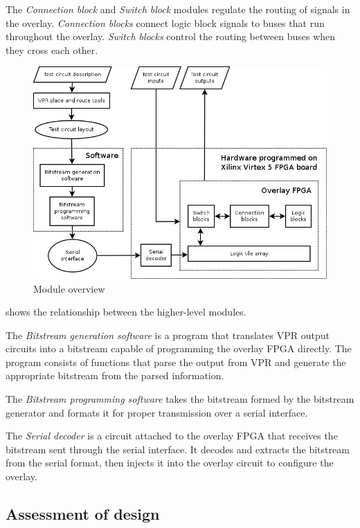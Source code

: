 The \emph{Connection block} and \emph{Switch block} modules regulate the routing of signals in the overlay.
\emph{Connection blocks} connect logic block signals to buses that run throughout the 
overlay.
\emph{Switch blocks} control the routing between buses when they cross each other.

\begin{figure}[!h]
	\centering
	\includegraphics[scale=0.6]{modules.png}
	\caption{Module overview}
	\label{module-diagram}
\end{figure}

 shows the relationship between the higher-level modules.

The \emph{Bitstream generation software} is a program that translates VPR output circuits into a bitstream capable of programming the overlay FPGA directly.
The program consists of functions that parse the output from VPR and generate the 
appropriate bitstream from the parsed information.

The \emph{Bitstream programming software} takes the bitstream formed by the bitstream generator and formats it for proper transmission over a serial interface.

The \emph{Serial decoder} is a circuit attached to the overlay FPGA that receives the 
bitstream sent through the serial interface.
It decodes and extracts the bitstream from the serial format, then injects it into the overlay circuit to configure the overlay.



\subsection{Assessment of design}

